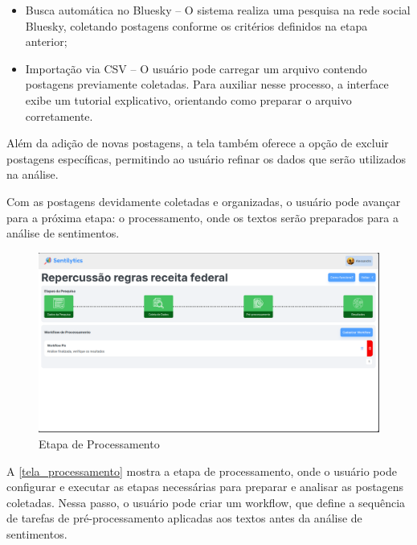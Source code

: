\documentclass[
	12pt,				%
	oneside,			%
	a4paper,			%
	english,			%
	french,				%
	spanish,			%
	brazil				%
	]{abntex2}
\begin{document}
\begin{itemize}
\tightlist
\item
  Busca automática no Bluesky -- O sistema realiza uma pesquisa na rede
  social Bluesky, coletando postagens conforme os critérios definidos na
  etapa anterior;
\item
  Importação via CSV -- O usuário pode carregar um arquivo contendo
  postagens previamente coletadas. Para auxiliar nesse processo, a
  interface exibe um tutorial explicativo, orientando como preparar o
  arquivo corretamente.
\end{itemize}

Além da adição de novas postagens, a tela também oferece a opção de
excluir postagens específicas, permitindo ao usuário refinar os dados
que serão utilizados na análise.

Com as postagens devidamente coletadas e organizadas, o usuário pode
avançar para a próxima etapa: o processamento, onde os textos serão
preparados para a análise de sentimentos.

\begin{figure}[htbp]
\hypertarget{tela_processamento}{%
\caption{Etapa de Processamento}\label{tela_processamento}
\begin{center}
\includegraphics[scale=0.2]{imagens/sentilytics/interface-grafica/processamento.png}
\end{center}
}
\end{figure}

A \autoref{tela_processamento} mostra a etapa de processamento, onde o
usuário pode configurar e executar as etapas necessárias para preparar e
analisar as postagens coletadas. Nessa passo, o usuário pode criar um
workflow, que define a sequência de tarefas de pré-processamento
aplicadas aos textos antes da análise de sentimentos.
\end{document}
